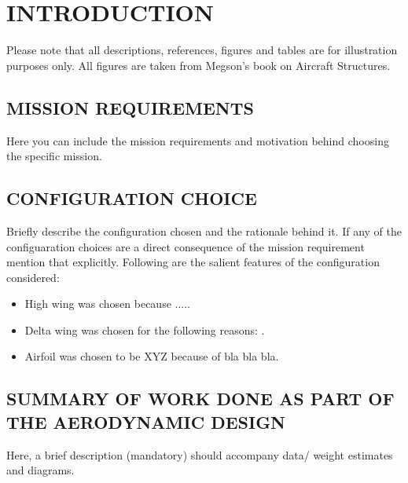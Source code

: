 \chapter{INTRODUCTION}
\label{ch1}
Please note that all descriptions, references, figures and tables are for illustration purposes only.
All figures are taken from Megson's book on Aircraft Structures.

\section{MISSION REQUIREMENTS}
\label{s:ch1_intro}
Here you can include the mission requirements and motivation behind choosing the specific mission.
%
\section{CONFIGURATION CHOICE}
Briefly describe the configuration chosen and the rationale behind it.
If any of the configuaration choices are a direct consequence of the mission requirement mention that explicitly.
Following are the salient features of the configuration considered:
\begin{itemize}
\item High wing was chosen because .....
\item Delta wing was chosen for the following reasons: .
\item Airfoil was chosen to be XYZ because of bla bla bla.
\end{itemize}
 
\section{SUMMARY OF WORK DONE AS PART OF THE AERODYNAMIC DESIGN}
%
Here, a brief description (mandatory) should accompany data/ weight estimates and diagrams.
%
